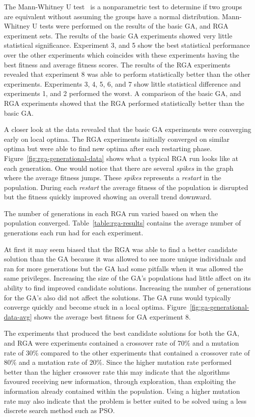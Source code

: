 The Mann-Whitney U test~\cite{mcknight2010mann} is a nonparametric test to determine if two groups are equivalent without assuming the groups have a normal distribution. Mann-Whitney U tests were performed on the results of the basic GA, and RGA experiment sets. The results of the basic GA experiments showed very little statistical significance. Experiment 3, and 5 show the best statistical performance over the other experiments which coincides with these experiments having the best fitness and average fitness scores. The results of the RGA experiments revealed that experiment 8 was able to perform statistically better than the other experiments. Experiments 3, 4, 5, 6, and 7 show little statistical difference and experiments 1, and 2 performed the worst. A comparison of the basic GA, and RGA experiments showed that the RGA performed statistically better than the basic GA.

A closer look at the data revealed that the basic GA experiments were converging early on local optima. The RGA experiments initially converged on similar optima but were able to find new optima after each restarting phase. Figure~\ref{fig:rga-generational-data} shows what a typical RGA run looks like at each generation. One would notice that there are several \textit{spikes} in the graph where the average fitness jumps. These \textit{spikes} represents a \textit{restart} in the population. During each \textit{restart} the average fitness of the population is disrupted but the fitness quickly improved showing an overall trend downward.

The number of generations in each RGA run varied based on when the population converged. Table~\ref{table:rga-results} contains the average number of generations each run had for each experiment.

At first it may seem biased that the RGA was able to find a better candidate solution than the GA because it was allowed to see more unique individuals and ran for more generations but the GA had some pitfalls when it was allowed the same privileges. Increasing the size of the GA's populations had little affect on its ability to find improved candidate solutions. Increasing the number of generations for the GA's also did not affect the solutions. The GA runs would typically converge quickly and become stuck in a local optima. Figure~\ref{fig:ga-generational-data-avg} shows the average best fitness for GA experiment 8.

The experiments that produced the best candidate solutions for both the GA, and RGA were experiments contained a crossover rate of 70\% and a mutation rate of 30\% compared to the other experiments that contained a crossover rate of 80\% and a mutation rate of 20\%. Since the higher mutation rate performed better than the higher crossover rate this may indicate that the algorithms favoured receiving new information, through exploration, than exploiting the information already contained within the population. Using a higher mutation rate may also indicate that the problem is better suited to be solved using a less discrete search method such as PSO.

